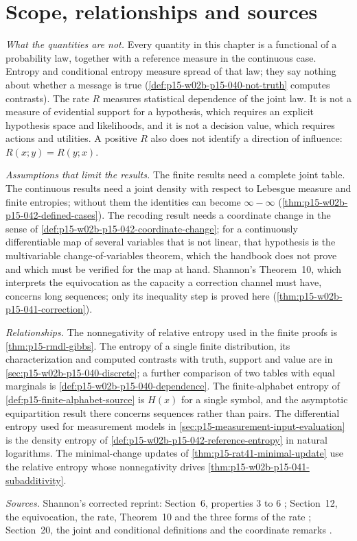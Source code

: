 \section{Scope, relationships and sources}
\label{sec:p15-w02b-p15-041-scope}

\emph{What the quantities are not.} Every quantity in this chapter is a
functional of a probability law, together with a reference measure in
the continuous case. Entropy and conditional entropy measure spread of
that law; they say nothing about whether a message is true
(\cref{def:p15-w02b-p15-040-not-truth} computes contrasts). The rate
\(R\) measures statistical dependence of the joint law. It is not a
measure of evidential support for a hypothesis, which requires an
explicit hypothesis space and likelihoods, and it is not a decision
value, which requires actions and utilities. A positive \(R\) also
does not identify a direction of influence: \(R(x;y)=R(y;x)\).

\emph{Assumptions that limit the results.} The finite results need a
complete joint table. The continuous results need a joint density with
respect to Lebesgue measure and finite entropies; without them the
identities can become \(\infty-\infty\)
(\cref{thm:p15-w02b-p15-042-defined-cases}). The recoding result needs a
coordinate change in the sense of
\cref{def:p15-w02b-p15-042-coordinate-change}; for a continuously
differentiable map of several variables that is not linear, that
hypothesis is the multivariable change-of-variables theorem, which the
handbook does not prove and which must be verified for the map at hand.
Shannon's Theorem~10, which interprets the equivocation as the capacity
a correction channel must have, concerns long sequences; only its
inequality step is proved here
(\cref{thm:p15-w02b-p15-041-correction}).

\emph{Relationships.} The nonnegativity of relative entropy used in the
finite proofs is \cref{thm:p15-rmdl-gibbs}. The entropy of a single
finite distribution, its characterization and computed contrasts with
truth, support and value are in \cref{sec:p15-w02b-p15-040-discrete};
a further comparison of two tables with equal marginals is
\cref{def:p15-w02b-p15-040-dependence}. The finite-alphabet entropy of
\cref{def:p15-finite-alphabet-source} is \(H(x)\) for a single symbol,
and the asymptotic equipartition result there concerns sequences rather
than pairs. The differential entropy used for measurement models in
\cref{sec:p15-measurement-input-evaluation} is the density entropy of
\cref{def:p15-w02b-p15-042-reference-entropy} in natural logarithms.
The minimal-change updates of \cref{thm:p15-rat41-minimal-update} use
the relative entropy whose nonnegativity drives
\cref{thm:p15-w02b-p15-041-subadditivity}.

\emph{Sources.} Shannon's corrected reprint: Section~6, properties 3
to 6 \cite[p.~12]{Shannon1948MathematicalTheory}; Section~12, the
equivocation, the rate, Theorem~10 and the three forms of the rate
\cite[pp.~20--21]{Shannon1948MathematicalTheory}; Section~20, the
joint and conditional definitions and the coordinate remarks
\cite[pp.~35--38]{Shannon1948MathematicalTheory}.
